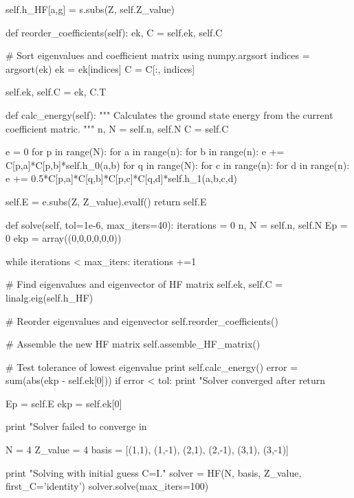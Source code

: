 \documentclass[%
oneside,                 %
final,                   %
10pt]{article}
\newenvironment{doconceexercise}{}{}
\begin{document}
\begin{doconceexercise}
                self.h_HF[a,g] = s.subs(Z, self.Z_value)

    def reorder_coefficients(self):
        ek, C = self.ek, self.C

        # Sort eigenvalues and coefficient matrix using numpy.argsort
        indices = argsort(ek)        
        ek = ek[indices]
        C = C[:, indices]

        self.ek, self.C = ek, C.T

    def calc_energy(self):
        """
        Calculates the ground state energy from the 
        current coefficient matric.
        """
        n, N = self.n, self.N
        C = self.C

        e = 0
        for p in range(N):
         for a in range(n):
           for b in range(n):
             e += C[p,a]*C[p,b]*self.h_0(a,b)
             for q in range(N):
              for c in range(n):
               for d in range(n):
                e += 0.5*C[p,a]*C[q,b]*C[p,c]*C[q,d]*self.h_1(a,b,c,d)

        self.E = e.subs(Z, Z_value).evalf()
        return self.E

    def solve(self, tol=1e-6, max_iters=40):
        iterations = 0
        n, N = self.n, self.N
        Ep = 0
        ekp = array((0,0,0,0,0,0))

        while iterations < max_iters:
            iterations +=1

            # Find eigenvalues and eigenvector of HF matrix
            self.ek, self.C = linalg.eig(self.h_HF)
            
            # Reorder eigenvalues and eigenvector
            self.reorder_coefficients()

            # Assemble the new HF matrix
            self.assemble_HF_matrix()
            
            # Test tolerance of lowest eigenvalue
            print self.calc_energy()
            error = sum(abs(ekp - self.ek[0]))
            if error < tol:
                print "Solver converged after %
                return

            Ep = self.E
            ekp = self.ek[0]

        print "Solver failed to converge in %


N = 4
Z_value = 4
basis = [(1,1), (1,-1), (2,1), (2,-1), (3,1), (3,-1)]

print "Solving with initial guess C=I."
solver = HF(N, basis, Z_value, first_C='identity')
solver.solve(max_iters=100)


\end{doconceexercise}
\end{document}
